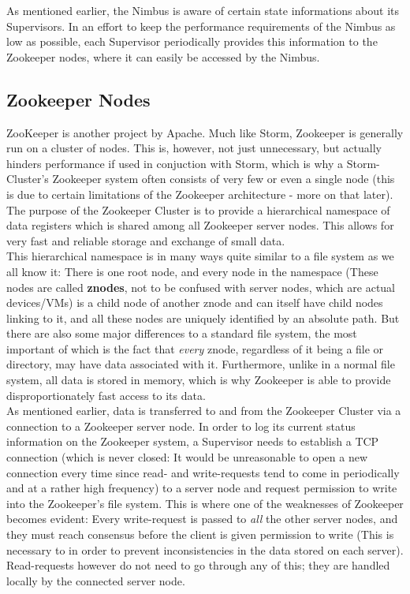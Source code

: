 \documentclass[12pt,a4paper]{article}
\begin{document}
As mentioned earlier, the Nimbus is aware of certain state informations about its Supervisors. In an effort to keep the performance requirements of the Nimbus as low as possible, each Supervisor periodically provides this information to the Zookeeper nodes, where it can easily be accessed by the Nimbus.

\subsection{Zookeeper Nodes}

ZooKeeper is another project by Apache. Much like Storm, Zookeeper is generally run on a cluster of nodes. This is, however, not just unnecessary, but actually hinders performance if used in conjuction with Storm, which is why a Storm-Cluster's Zookeeper system often consists of very few or even a single node (this is due to certain limitations of the Zookeeper architecture - more on that later). The purpose of the Zookeeper Cluster is to provide a hierarchical namespace of data registers which is shared among all Zookeeper server nodes. This allows for very fast and reliable storage and exchange of small data.\\

This hierarchical namespace is in many ways quite similar to a file system as we all know it: There is one root node, and every node in the namespace (These nodes are called \textbf{znodes}, not to be confused with server nodes, which are actual devices/VMs) is a child node of another znode and can itself have child nodes linking to it, and all these nodes are uniquely identified by an absolute path. But there are also some major differences to a standard file system, the most important of which is the fact that \textit{every} znode, regardless of it being a file or directory, may have data associated with it. Furthermore, unlike in a normal file system, all data is stored in memory, which is why Zookeeper is able to provide disproportionately fast access to its data.\\

As mentioned earlier, data is transferred to and from the Zookeeper Cluster via a connection to a Zookeeper server node. In order to log its current status information on the Zookeeper system, a Supervisor needs to establish a TCP connection (which is never closed: It would be unreasonable to open a new connection every time since read- and write-requests tend to come in periodically and at a rather high frequency) to a server node and request permission to write into the Zookeeper's file system. This is where one of the weaknesses of Zookeeper becomes evident: Every write-request is passed to \textit{all} the other server nodes, and they must reach consensus before the client is given permission to write (This is necessary to in order to prevent inconsistencies in the data stored on each server). Read-requests however do not need to go through any of this; they are handled locally by the connected server node.\\
\end{document}
